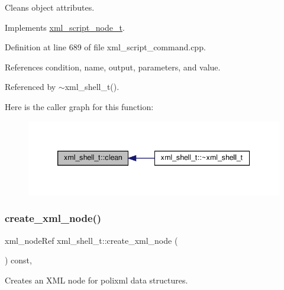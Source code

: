 Cleans object attributes. 



Implements \hyperlink{classxml__script__node__t_a2be778f2caef531c55b36c2bf2c996e2}{xml\+\_\+script\+\_\+node\+\_\+t}.



Definition at line 689 of file xml\+\_\+script\+\_\+command.\+cpp.



References condition, name, output, parameters, and value.



Referenced by $\sim$xml\+\_\+shell\+\_\+t().

Here is the caller graph for this function\+:
\nopagebreak
\begin{figure}[H]
\begin{center}
\leavevmode
\includegraphics[width=339pt]{dc/d20/classxml__shell__t_a372d74254457c1e1a7f2ffa093d25397_icgraph}
\end{center}
\end{figure}
\mbox{\label{classxml__shell__t_a8e65fb9948e3fdc63e370de8c67cfefc}} 
\subsubsection{\texorpdfstring{create\+\_\+xml\+\_\+node()}{create\_xml\_node()}}
{\footnotesize\ttfamily xml\+\_\+node\+Ref xml\+\_\+shell\+\_\+t\+::create\+\_\+xml\+\_\+node (\begin{DoxyParamCaption}{ }\end{DoxyParamCaption}) const\hspace{0.3cm}{\ttfamily [override]}, {\ttfamily [virtual]}}



Creates an X\+ML node for polixml data structures. 




